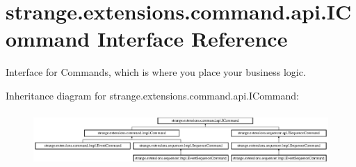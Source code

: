 \hypertarget{interfacestrange_1_1extensions_1_1command_1_1api_1_1_i_command}{\section{strange.\-extensions.\-command.\-api.\-I\-Command Interface Reference}
\label{interfacestrange_1_1extensions_1_1command_1_1api_1_1_i_command}
}


Interface for Commands, which is where you place your business logic.  


Inheritance diagram for strange.\-extensions.\-command.\-api.\-I\-Command\-:\begin{figure}[H]
\begin{center}
\leavevmode
\includegraphics[height=2.068329cm]{interfacestrange_1_1extensions_1_1command_1_1api_1_1_i_command}
\end{center}
\end{figure}
